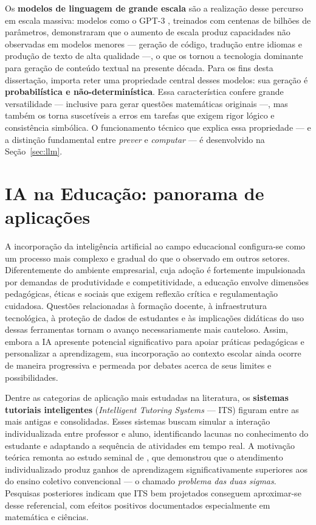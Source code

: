 Os \textbf{modelos de linguagem de grande escala} são a realização desse percurso em escala
massiva: modelos como o GPT-3 \citep{brown2020gpt3}, treinados com centenas de bilhões de
parâmetros, demonstraram que o aumento de escala produz capacidades não observadas em modelos
menores --- geração de código, tradução entre idiomas e produção de texto de alta qualidade ---,
o que os tornou a tecnologia dominante para geração de conteúdo textual na presente década. Para
os fins desta dissertação, importa reter uma propriedade central desses modelos: sua geração é
\textbf{probabilística e não-determinística}. Essa característica confere grande versatilidade ---
inclusive para gerar questões matemáticas originais ---, mas também os torna suscetíveis a erros
em tarefas que exigem rigor lógico e consistência simbólica. O funcionamento técnico que explica
essa propriedade --- e a distinção fundamental entre \emph{prever} e \emph{computar} --- é
desenvolvido na Seção~\ref{sec:llm}.

\section{IA na Educação: panorama de aplicações}
\label{sec:ia-educacao}

A incorporação da inteligência artificial ao campo educacional configura-se como um processo mais
complexo e gradual do que o observado em outros setores. Diferentemente do ambiente empresarial,
cuja adoção é fortemente impulsionada por demandas de produtividade e competitividade, a educação
envolve dimensões pedagógicas, éticas e sociais que exigem reflexão crítica e regulamentação
cuidadosa. Questões relacionadas à formação docente, à infraestrutura tecnológica, à proteção de
dados de estudantes e às implicações didáticas do uso dessas ferramentas tornam o avanço
necessariamente mais cauteloso. Assim, embora a IA apresente potencial significativo para apoiar
práticas pedagógicas e personalizar a aprendizagem, sua incorporação ao contexto escolar ainda
ocorre de maneira progressiva e permeada por debates acerca de seus limites e possibilidades.

Dentre as categorias de aplicação mais estudadas na literatura, os \textbf{sistemas tutoriais
inteligentes} (\emph{Intelligent Tutoring Systems} --- ITS) figuram entre as mais antigas e
consolidadas. Esses sistemas buscam simular a interação individualizada entre professor e aluno,
identificando lacunas no conhecimento do estudante e adaptando a sequência de atividades em tempo
real. A motivação teórica remonta ao estudo seminal de \citet{bloom1984twosigma}, que demonstrou
que o atendimento individualizado produz ganhos de aprendizagem significativamente superiores aos
do ensino coletivo convencional --- o chamado \emph{problema das duas sigmas}. Pesquisas
posteriores indicam que ITS bem projetados conseguem aproximar-se desse referencial, com efeitos
positivos documentados especialmente em matemática e ciências.

